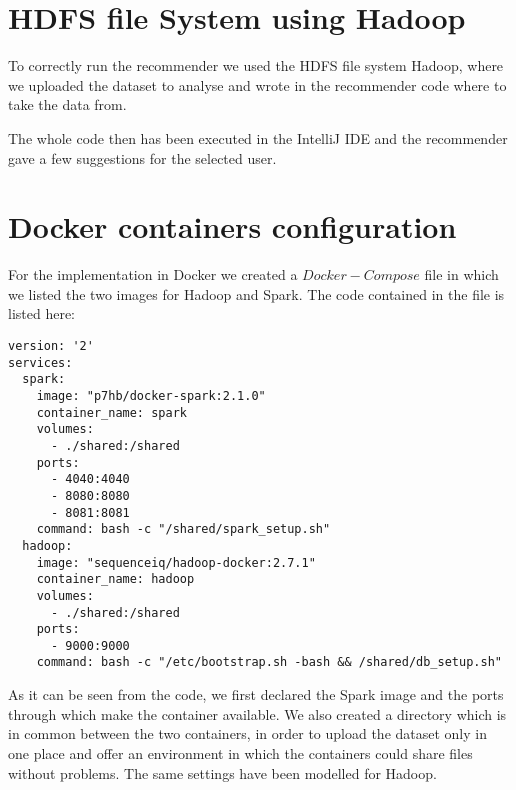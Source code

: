 \documentclass[11pt,a4paper,titlepage]{article}
\begin{document}
\section{HDFS file System using Hadoop}
To correctly run the recommender we used the HDFS file system Hadoop, where we uploaded the dataset to analyse and wrote in the recommender code where to take the data from.

The whole code then has been executed in the IntelliJ IDE and the recommender gave a few suggestions for the selected user.


\section{Docker containers configuration}
For the implementation in Docker we created a $Docker-Compose$ file in which we listed the two images for Hadoop and Spark. The code contained in the file is listed here:

\begin{lstlisting}
version: '2'
services:
  spark:
    image: "p7hb/docker-spark:2.1.0"
    container_name: spark
    volumes:
      - ./shared:/shared
    ports:
      - 4040:4040
      - 8080:8080
      - 8081:8081
    command: bash -c "/shared/spark_setup.sh"
  hadoop:
    image: "sequenceiq/hadoop-docker:2.7.1"
    container_name: hadoop
    volumes:
      - ./shared:/shared
    ports:
      - 9000:9000
    command: bash -c "/etc/bootstrap.sh -bash && /shared/db_setup.sh"
\end{lstlisting}

As it can be seen from the code, we first declared the Spark image and the ports through which make the container available. We also created a directory which is in common between the two containers, in order to upload the dataset only in one place and offer an environment in which the containers could share files without problems. The same settings have been modelled for Hadoop.
\end{document}
